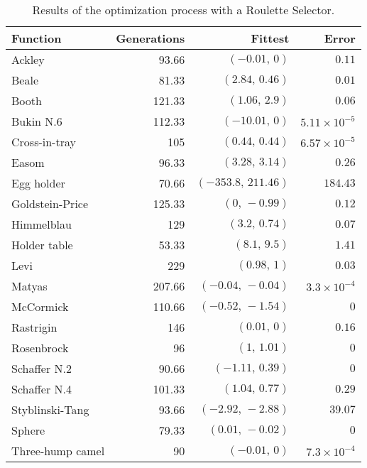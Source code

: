     \begin{table}[H]
      \centering
      \begin{tabular}{|l|r|r|r|}
        \hline
        Function  & Generations & Fittest 
          & Error \\
        \hline\hline
        Ackley	& 93.66	& \((-0.01,\, 0)\)	& \(0.11\)\\\hline
        Beale	& 81.33	& \((2.84,\, 0.46)\)	& \(0.01\)\\\hline
        Booth	& 121.33	& \((1.06,\, 2.9)\)	& \(0.06\)\\\hline
        Bukin N.6	& 112.33	& \((-10.01,\, 0)\)	& \(5.11 \times 10^{-5}\)\\\hline
        Cross-in-tray	& 105	& \((0.44,\, 0.44)\)	& \(6.57 \times 10^{-5}\)\\\hline
        Easom	& 96.33	& \((3.28,\, 3.14)\)	& \(0.26\)\\\hline
        Egg holder	& 70.66	& \((-353.8,\, 211.46)\)	& \(184.43\)\\\hline
        Goldstein-Price	& 125.33	& \((0,\, -0.99)\)	& \(0.12\)\\\hline
        Himmelblau	& 129	& \((3.2,\, 0.74)\)	& \(0.07\)\\\hline
        Holder table	& 53.33	& \((8.1,\, 9.5)\)	& \(1.41\)\\\hline
        Levi	& 229 & \((0.98,\, 1)\)	& \(0.03\)\\\hline
        Matyas	& 207.66	& \((-0.04,\, -0.04)\)	& \(3.3 \times 10^{-4}\)\\\hline
        McCormick	& 110.66	& \((-0.52,\, -1.54)\)	& \(0\)\\\hline
        Rastrigin	& 146	& \((0.01,\, 0)\)	& \(0.16\)\\\hline
        Rosenbrock	& 96	& \((1,\, 1.01)\)	& \(0\)\\\hline
        Schaffer N.2	& 90.66	& \((-1.11,\, 0.39)\)	& \(0\)\\\hline
        Schaffer N.4	& 101.33	& \((1.04,\, 0.77)\)	& \(0.29\)\\\hline
        Styblinski-Tang	& 93.66	& \((-2.92,\, -2.88)\)	& \(39.07\)\\\hline
        Sphere	& 79.33	& \((0.01,\, -0.02)\)	& \(0\)\\\hline
        Three-hump camel	& 90	& \((-0.01,\, 0)\)	& \(7.3 \times 10^{-4}\)\\\hline
      \end{tabular}
      \caption{Results of the optimization process with a Roulette Selector.}
      \label{tab:fn_opt:results:roulette}
    \end{table}
